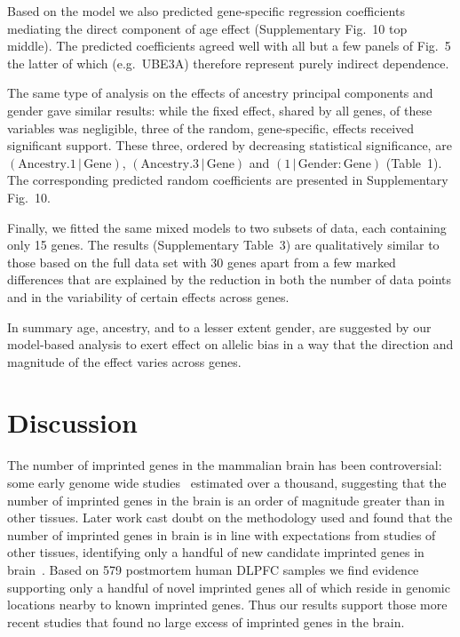 \documentclass[letterpaper]{article}
\begin{document}
Based on the model we also predicted
gene-specific regression coefficients mediating the direct component of age
effect (Supplementary Fig.~10 top middle).  The predicted coefficients
agreed well with all but a few panels of Fig.~5 the latter of
which (e.g.~UBE3A) therefore represent purely indirect dependence.

The same type of analysis on the effects of ancestry principal components and
gender gave similar results: while the fixed effect, shared by all genes, of
these variables was negligible, three of the random, gene-specific, effects
received significant support.  These three, ordered by decreasing
statistical significance, are
\((\mathrm{Ancestry.1}\,|\,\mathrm{Gene})\),
\((\mathrm{Ancestry.3}\,|\,\mathrm{Gene})\) and
\((1\,|\,\mathrm{Gender}:\mathrm{Gene})\) (Table~1).  The
corresponding predicted random coefficients are presented in
Supplementary Fig.~10.

Finally, we fitted the same mixed models to two subsets of data, each
containing only 15 genes.  The results (Supplementary Table~3) are
qualitatively similar to those based on the full data set with 30 genes apart
from a few marked differences that are explained by the reduction in both the
number of data points and in the variability of certain effects across genes.

In summary age, ancestry, and to a lesser extent gender, are suggested by our
model-based analysis to exert effect on allelic bias in a way that the
direction and magnitude of the effect varies across genes.

\section*{Discussion}

The number of imprinted genes in the mammalian brain has been controversial:
some early genome wide studies~\cite{Gregg2010a,Gregg2010} estimated over a
thousand, suggesting that the number of imprinted genes in the brain is an
order of magnitude greater than in other tissues.  Later work cast doubt on
the methodology used and found that the number of imprinted genes in brain is
in line with expectations from studies of other tissues, identifying only a
handful of new candidate imprinted genes in brain~\cite{Baran2015,DeVeale2012,Perez2015}.
Based on 579 postmortem human DLPFC
samples we find evidence supporting only a handful of novel imprinted genes
all of which reside in genomic locations nearby to known imprinted genes.
Thus our results support those more recent studies that found no large excess
of imprinted genes in the brain.
\end{document}
